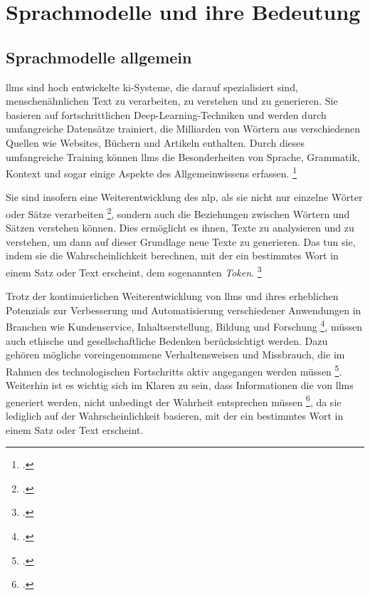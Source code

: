 \section{Sprachmodelle und ihre Bedeutung} \label{sec:sprachmodelle}
\subsection{Sprachmodelle allgemein} \label{sec:sprachmodelle_allgemein}
\acp{llm} sind hoch entwickelte \ac{ki}-Systeme, die darauf spezialisiert sind, menschenähnlichen Text zu verarbeiten, zu verstehen und zu generieren.
Sie basieren auf fortschrittlichen Deep-Learning-Techniken und werden durch umfangreiche Datensätze trainiert, die Milliarden von Wörtern aus verschiedenen Quellen wie Websites, Büchern und Artikeln enthalten.
Durch dieses umfangreiche Training können \acp{llm} die Besonderheiten von Sprache, Grammatik, Kontext und sogar einige Aspekte des Allgemeinwissens erfassen. \footcite[Vgl.][S. 93 ff.]{Taulli2023}

Sie sind insofern eine Weiterentwicklung des \ac{nlp}, als sie nicht nur einzelne Wörter oder Sätze verarbeiten \footcite[Vgl.][S. 245 ff.]{NLP_2008}, sondern auch die Beziehungen zwischen Wörtern und Sätzen verstehen können.
Dies ermöglicht es ihnen, Texte zu analysieren und zu verstehen, um dann auf dieser Grundlage neue Texte zu generieren.
Das tun sie, indem sie die Wahrscheinlichkeit berechnen, mit der ein bestimmtes Wort in einem Satz oder Text erscheint, dem sogenannten \textit{Token}. \footcite[Vgl.][]{google:llm}

Trotz der kontinuierlichen Weiterentwicklung von \acp{llm} und ihres erheblichen Potenzials zur Verbesserung und Automatisierung verschiedener Anwendungen in Branchen wie Kundenservice, Inhaltserstellung, Bildung und Forschung \footcite[Vgl.][S. 4 ff.]{tamkin2021understanding}, müssen auch ethische und gesellschaftliche Bedenken berücksichtigt werden. Dazu gehören mögliche voreingenommene Verhaltensweisen und Missbrauch, die im Rahmen des technologischen Fortschritts aktiv angegangen werden müssen \footcite[Vgl.][S. 1]{Tokayev_2023}.
Weiterhin ist es wichtig sich im Klaren zu sein, dass Informationen die von \acp{llm} generiert werden, nicht unbedingt der Wahrheit entsprechen müssen \footcite[Vgl.][S. 217 f.]{10.1145/3531146.3533088}, da sie lediglich auf der Wahrscheinlichkeit basieren, mit der ein bestimmtes Wort in einem Satz oder Text erscheint.

